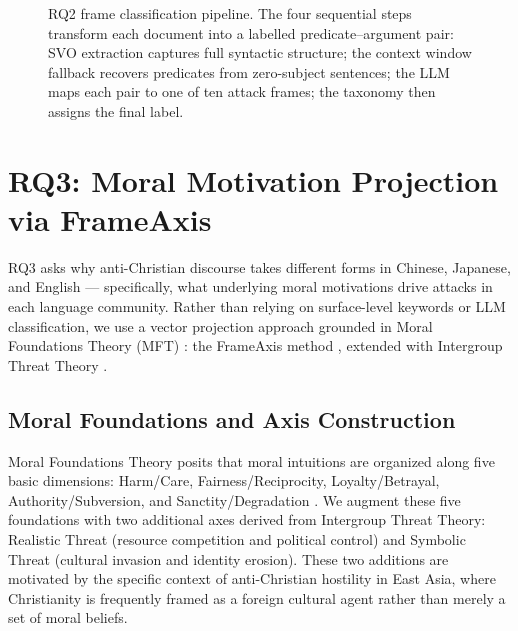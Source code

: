 \documentclass[../CLthesis.tex]{subfiles}
\begin{document}
\begin{figure}[t]
\caption{RQ2 frame classification pipeline. The four sequential steps transform each document into a labelled predicate--argument pair: SVO extraction captures full syntactic structure; the context window fallback recovers predicates from zero-subject sentences; the LLM maps each pair to one of ten attack frames; the taxonomy then assigns the final label.}
\label{fig:rq2-pipeline}
\end{figure}

\section{RQ3: Moral Motivation Projection via FrameAxis}
\label{sec:rq3}

RQ3 asks why anti-Christian discourse takes different forms in Chinese, Japanese, and English — specifically, what underlying moral motivations drive attacks in each language community. Rather than relying on surface-level keywords or LLM classification, we use a vector projection approach grounded in Moral Foundations Theory (MFT) \citep{graham2009liberals}: the FrameAxis method \citep{Kwak_2021}, extended with Intergroup Threat Theory \citep{stephan2000integrated}.

\subsection{Moral Foundations and Axis Construction}

Moral Foundations Theory posits that moral intuitions are organized along five basic dimensions: Harm/Care, Fairness/Reciprocity, Loyalty/Betrayal, Authority/Subversion, and Sanctity/Degradation \citep{graham2009liberals}. We augment these five foundations with two additional axes derived from Intergroup Threat Theory: Realistic Threat (resource competition and political control) and Symbolic Threat (cultural invasion and identity erosion). These two additions are motivated by the specific context of anti-Christian hostility in East Asia, where Christianity is frequently framed as a foreign cultural agent rather than merely a set of moral beliefs.
\end{document}
